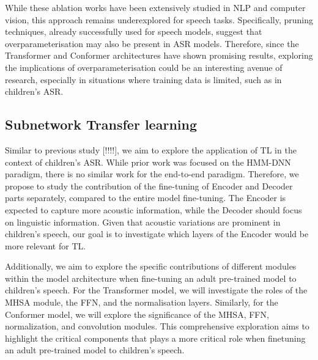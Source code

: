 While these ablation works have been extensively studied in NLP and computer vision, this approach remains underexplored for speech tasks. Specifically, pruning techniques, already successfully used for speech models, suggest that overparameterisation may also be present in ASR models. Therefore, since the Transformer and Conformer architectures have shown promising results, exploring the implications of overparameterisation could be an interesting avenue of research, especially in situations where training data is limited, such as in children's ASR.


\subsection{Subnetwork Transfer learning}
Similar to previous study [!!!!], we aim to explore the application of TL in the context of children's ASR. While prior work was focused on the HMM-DNN paradigm, there is no similar work for the end-to-end paradigm. Therefore, we propose to study the contribution of the fine-tuning of Encoder and Decoder parts separately, compared to the entire model fine-tuning. The Encoder is expected to capture more acoustic information, while the Decoder should focus on linguistic information. Given that acoustic variations are prominent in children's speech, our goal is to investigate which layers of the Encoder would be more relevant for TL.

Additionally, we aim to explore the specific contributions of different modules within the model architecture when fine-tuning an adult pre-trained model to children's speech. For the Transformer model, we will investigate the roles of the MHSA module, the FFN, and the normalisation layers. Similarly, for the Conformer model, we will explore the significance of the MHSA, FFN, normalization, and convolution modules. This comprehensive exploration aims to highlight the critical components that plays a more critical role when finetuning an adult pre-trained model to children's speech.


